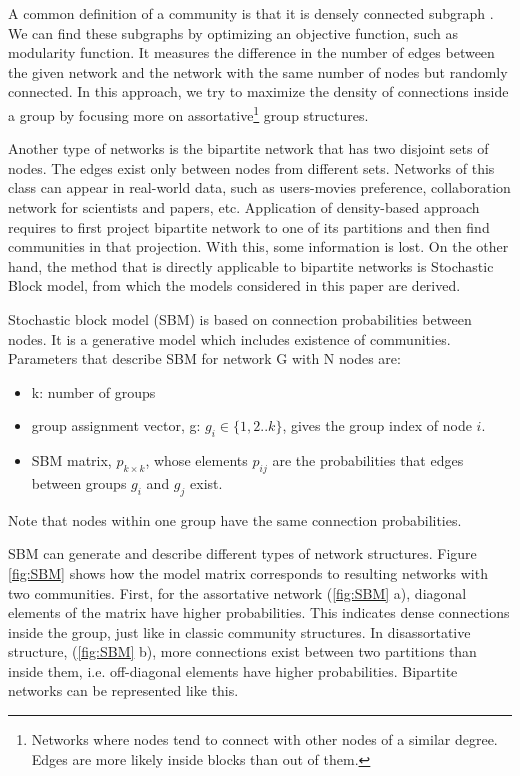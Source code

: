 A common definition of a community is that it is densely connected subgraph \cite{userguide}. We can find these subgraphs by optimizing an objective function, such as modularity function. It measures the difference in the number of edges between the given network and the network with the same number of nodes but randomly connected. In this approach, we try to maximize the density of connections inside a group by focusing more on assortative\footnote{Networks where nodes tend to connect with other nodes of a similar degree. Edges are more likely inside blocks than out of them.} group structures. 

Another type of networks is the bipartite network that has two disjoint sets of nodes. The edges exist only between nodes from different sets. Networks of this class can appear in real-world data, such as users-movies preference, collaboration network for scientists and papers, etc. Application of density-based approach requires to first project bipartite network to one of its partitions and then find communities in that projection. With this, some information is lost. On the other hand, the method that is directly applicable to bipartite networks is Stochastic Block model, from which the models considered in this paper are derived.

Stochastic block model (SBM) is based on connection probabilities between nodes. It is a generative model which includes existence of communities. Parameters that describe SBM for network G with N nodes are:

\begin{itemize}
	\item k: number of groups
	\item group assignment vector, g: $g_i \in\{1,2..k\}$, gives the group index of node $i$.
	\item SBM matrix, $p_{k \times k}$, whose elements $p_{ij}$ are the probabilities that edges between groups $g_i$ and $g_j$ exist.
\end{itemize}

Note that nodes within one group have the same connection probabilities.

SBM can generate and describe different types of network structures. Figure \ref{fig:SBM} \cite{userguide} shows how the model matrix corresponds to resulting networks with two communities. First, for the assortative network (\ref{fig:SBM} a), diagonal elements of the matrix have higher probabilities. This indicates dense connections inside the group, just like in classic community structures. In disassortative structure, (\ref{fig:SBM} b), more connections exist between two partitions than inside them, i.e. off-diagonal elements have higher probabilities. Bipartite networks can be represented like this. 

